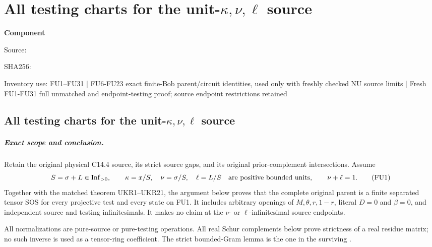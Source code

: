 \chapter{All testing charts for the unit-$\kappa,\nu,\ell$ source}
\label{component:p3f02c51074be}
\noindent\textbf{Component }\par
{\small\noindent Source: \par}
{\small\noindent SHA256: \par}
{\small\noindent Inventory use: FU1--FU31 | FU6-FU23 exact finite-Bob parent/circuit identities, used only with freshly checked NU source limits | Fresh FU1-FU31 full unmatched and endpoint-testing proof; source endpoint restrictions retained\par}
\medskip
\section{All testing charts for the unit-$\kappa,\nu,\ell$ source}
\label{p3f02c51074be:sec:new-c144-unit-kappa-all-tests}

\paragraph{Exact scope and conclusion.}
Retain the original physical C14.4 source, its strict source gaps,
and its original prior-complement intersections. Assume
\[
 S=\sigma+L\in\operatorname{Inf}_{>0},\qquad
 \kappa=x/S,\quad\nu=\sigma/S,\quad\ell=L/S
 \quad\hbox{are positive bounded units},\qquad\nu+\ell=1.
 \tag{FU1}
\]
Together with the matched theorem UKR1--UKR21, the argument below
proves that the complete original parent is a finite separated tensor
SOS for every projective test and every state on FU1. It includes
arbitrary openings of $M,\theta,r,1-r$, literal $D=0$ and $\beta=0$,
and independent source and testing infinitesimals. It makes no claim
at the $\nu$- or $\ell$-infinitesimal source endpoints.

All normalizations are pure-source or pure-testing operations.
All real Schur complements below prove strictness of a real residue
matrix; no such inverse is used as a tensor-ring coefficient. The
strict bounded-Gram lemma is the one in the surviving
.

